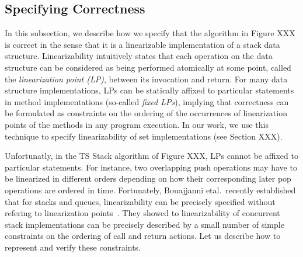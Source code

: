 \subsection{Specifying Correctness}
In this subsection, we describe how we specify that the algorithm in Figure XXX
is correct in the sense that it is a linearizable implementation of a
stack data structure. Linearizability intuitively states that
each operation on the data structure can be considered as being
performed atomically at some point, called the {\em linearization point (LP)},
between its invocation and return.
For many data structure implementations, LPs can be statically
affixed to particular statements in method implementations (so-called
{\em fixed LPs}),
implying that correctness can be formulated as constraints on the ordering of the
occurrences of linearization points of the methods in any program
execution.
In our work, we use this technique to specify linearizability of
set implementations (see Section XXX).

Unfortunatly, in the TS Stack algorithm of Figure XXX, LPs cannot be affixed
to particular statements. For instance,  two overlapping
push operations may have to be linearized in different orders depending
on how their corresponding later pop operations are ordered in time.
Fortunately, Bouajjanni etal.\ recently established that for stacks and
queues, linearizability can be precisely specified without refering to
linearization points~\cite{BEEH:icalp15}. They showed to linearizability
of concurrent stack implementations can be precisely described by
a small number of simple 
constraints on the ordering of call and return actions.
Let us describe how to represent and verify these constraints.

